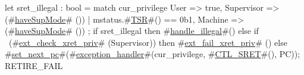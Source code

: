 let sret_illegal : bool = match cur_privilege {
  User       => true,
  Supervisor => ~ (#\hyperref[sailRISCVzhaveSupMode]{haveSupMode}# ()) | mstatus.#\hyperref[sailRISCVzTSR]{TSR}#() == 0b1,
  Machine    => ~ (#\hyperref[sailRISCVzhaveSupMode]{haveSupMode}# ())
};
if   sret_illegal
then #\hyperref[sailRISCVzhandlezyillegal]{handle\_illegal}#()
else if ~(#\hyperref[sailRISCVzextzycheckzyxretzypriv]{ext\_check\_xret\_priv}# (Supervisor))
then #\hyperref[sailRISCVzextzyfailzyxretzypriv]{ext\_fail\_xret\_priv}# ()
else #\hyperref[sailRISCVzsetzynextzypc]{set\_next\_pc}#(#\hyperref[sailRISCVzexceptionzyhandler]{exception\_handler}#(cur_privilege, #\hyperref[sailRISCVzCTLzySRET]{CTL\_SRET}#(), PC));
RETIRE_FAIL
